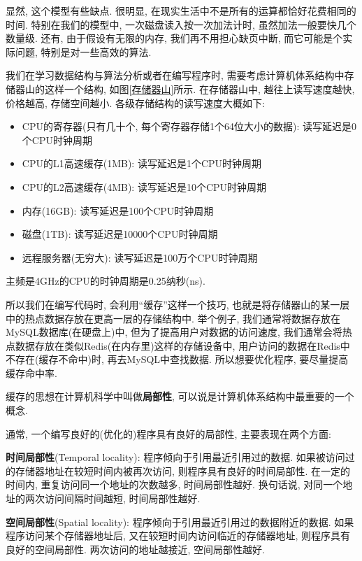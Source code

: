 \documentclass[oneside]{ctexbook}
\begin{document}
{显然, 这个模型有些缺点. 很明显, 在现实生活中不是所有的运算都恰好花费相同的时间. 特别在我们的模型中, 一次磁盘读入按一次加法计时, 虽然加法一般要快几个数量级. 还有, 由于假设有无限的内存, 我们再不用担心缺页中断, 而它可能是个实际问题, 特别是对一些高效的算法.

我们在学习数据结构与算法分析或者在编写程序时, 需要考虑计算机体系结构中存储器山的这样一个结构, 如图\ref{存储器山}所示. 在存储器山中, 越往上读写速度越快, 价格越高, 存储空间越小. 各级存储结构的读写速度大概如下:

\begin{itemize}
    \item CPU的寄存器(只有几十个, 每个寄存器存储1个64位大小的数据): 读写延迟是0个CPU时钟周期
    \item CPU的L1高速缓存(1MB): 读写延迟是1个CPU时钟周期
    \item CPU的L2高速缓存(4MB): 读写延迟是10个CPU时钟周期
    \item 内存(16GB): 读写延迟是100个CPU时钟周期
    \item 磁盘(1TB): 读写延迟是10000个CPU时钟周期
    \item 远程服务器(无穷大): 读写延迟是100万个CPU时钟周期
\end{itemize}

\begin{marker}
主频是4GHz的CPU的时钟周期是0.25纳秒(ns).
\end{marker}

所以我们在编写代码时, 会利用``缓存''这样一个技巧, 也就是将存储器山的某一层中的热点数据存放在更高一层的存储结构中. 举个例子, 我们通常将数据存放在MySQL数据库(在硬盘上)中, 但为了提高用户对数据的访问速度, 我们通常会将热点数据存放在类似Redis(在内存里)这样的存储设备中, 用户访问的数据在Redis中不存在(缓存不命中)时, 再去MySQL中查找数据. 所以想要优化程序, 要尽量提高缓存命中率.

缓存的思想在计算机科学中叫做\textbf{局部性}, 可以说是计算机体系结构中最重要的一个概念.

通常, 一个编写良好的(优化的)程序具有良好的局部性, 主要表现在两个方面:

\textbf{时间局部性}(Temporal locality): 程序倾向于引用最近引用过的数据. 如果被访问过的存储器地址在较短时间内被再次访问, 则程序具有良好的时间局部性. 在一定的时间内, 重复访问同一个地址的次数越多, 时间局部性越好. 换句话说, 对同一个地址的两次访问间隔时间越短, 时间局部性越好.

\textbf{空间局部性}(Spatial locality): 程序倾向于引用最近引用过的数据附近的数据. 如果程序访问某个存储器地址后, 又在较短时间内访问临近的存储器地址, 则程序具有良好的空间局部性. 两次访问的地址越接近, 空间局部性越好.

}
\end{document}
